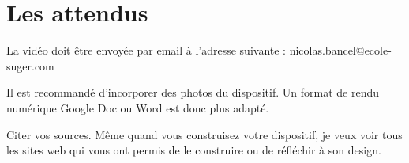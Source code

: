 \documentclass[a4paper,12pt]{article}
\begin{document}
\section*{Les attendus}

\begin{compactitem}
\item La vidéo doit être envoyée par email à l'adresse suivante : nicolas.bancel@ecole-suger.com 
\item Il est recommandé d'incorporer des photos du dispositif. Un format de rendu numérique Google Doc ou Word est donc plus adapté.
\item Citer vos sources. Même quand vous construisez votre dispositif, je veux voir tous les sites web qui vous ont permis de le construire ou de réfléchir à son design.
\end{compactitem}
\end{document}
